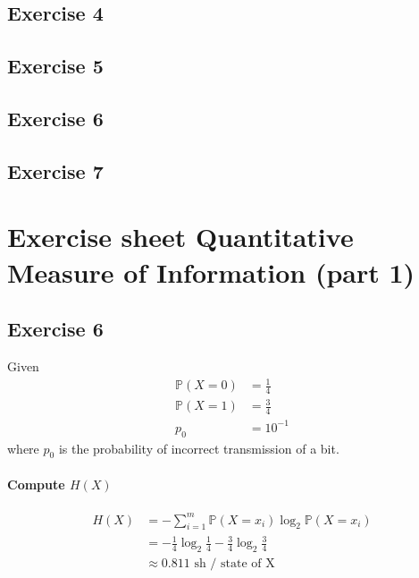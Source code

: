 \documentclass{article}
\newcommand{\1}{\mathbf{1}}
\renewcommand{\P}{\mathbb{P}}
\begin{document}
\subsection{Exercise 4}
\subsection{Exercise 5}
\subsection{Exercise 6}
\subsection{Exercise 7}


\section{Exercise sheet Quantitative Measure of Information (part 1)}
\subsection{Exercise 6}
Given
\begin{align*}
  \P(X = 0) & = \frac{1}{4} \\
  \P(X = 1) & = \frac{3}{4} \\
  p_0       & = 10^{-1}
\end{align*}
where $p_0$ is the probability of incorrect transmission of a bit.


\paragraph{Compute $H(X)$}
\begin{align*}
  H(X) & = - \sum_{i=1}^{m} \P(X = x_i) \log_2 \P(X = x_i)                   \\
       & = - \frac{1}{4} \log_2 \frac{1}{4} - \frac{3}{4} \log_2 \frac{3}{4} \\
       & \approx 0.811 \text{ sh / state of X}
\end{align*}
\end{document}
